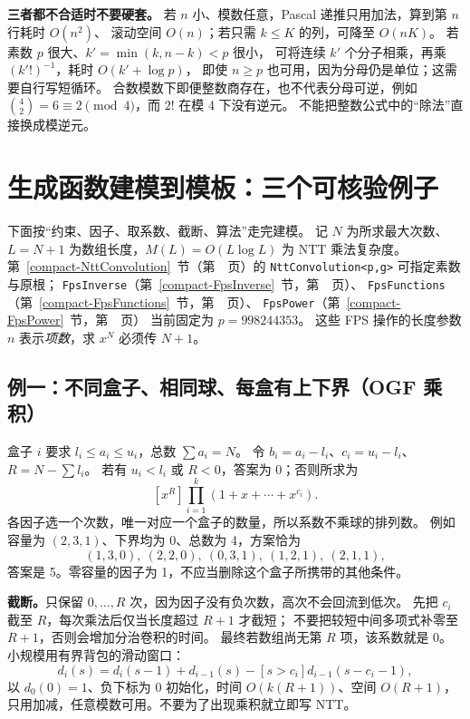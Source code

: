 \textbf{三者都不合适时不要硬套。}
若 $n$ 小、模数任意，Pascal 递推只用加法，算到第 $n$ 行耗时 $O(n^2)$、
滚动空间 $O(n)$；若只需 $k\le K$ 的列，可降至 $O(nK)$。
若素数 $p$ 很大、$k'=\min(k,n-k)<p$ 很小，
可将连续 $k'$ 个分子相乘，再乘 $(k'!)^{-1}$，耗时 $O(k'+\log p)$，
即使 $n\ge p$ 也可用，因为分母仍是单位；这需要自行写短循环。
合数模数下即便整数商存在，也不代表分母可逆，例如
$\binom42=6\equiv2\pmod4$，而 $2!$ 在模 4 下没有逆元。
不能把整数公式中的“除法”直接换成模逆元。

\section{生成函数建模到模板：三个可核验例子}\label{knowledge-generating-examples}
下面按“约束、因子、取系数、截断、算法”走完建模。
记 $N$ 为所求最大次数、$L=N+1$ 为数组长度，$M(L)=O(L\log L)$ 为 NTT 乘法复杂度。
第~\ref{compact-NttConvolution}~节（第~\pageref{compact-NttConvolution}~页）的 \texttt{NttConvolution<p,g>} 可指定素数与原根；
\texttt{FpsInverse}（第~\ref{compact-FpsInverse}~节，第~\pageref{compact-FpsInverse}~页）、
\texttt{FpsFunctions}（第~\ref{compact-FpsFunctions}~节，第~\pageref{compact-FpsFunctions}~页）、
\texttt{FpsPower}（第~\ref{compact-FpsPower}~节，第~\pageref{compact-FpsPower}~页）
当前固定为 $p=998244353$。
这些 FPS 操作的长度参数 $n$ 表示\emph{项数}，求 $x^N$ 必须传 $N+1$。

\subsection{例一：不同盒子、相同球、每盒有上下界（OGF 乘积）}
盒子 $i$ 要求 $l_i\le a_i\le u_i$，总数 $\sum a_i=N$。
令 $b_i=a_i-l_i$、$c_i=u_i-l_i$、$R=N-\sum l_i$。
若有 $u_i<l_i$ 或 $R<0$，答案为 0；否则所求为
\[
[x^R]\prod_{i=1}^k(1+x+\cdots+x^{c_i}).
\]
各因子选一个次数，唯一对应一个盒子的数量，所以系数不乘球的排列数。
例如容量为 $(2,3,1)$、下界均为 0、总数为 4，方案恰为
\[
(1,3,0),\ (2,2,0),\ (0,3,1),\ (1,2,1),\ (2,1,1),
\]
答案是 5。零容量的因子为 1，不应当删除这个盒子所携带的其他条件。

\textbf{截断。}只保留 $0,\ldots,R$ 次，因为因子没有负次数，高次不会回流到低次。
先把 $c_i$ 截至 $R$，每次乘法后仅当长度超过 $R+1$ 才截短；
不要把较短中间多项式补零至 $R+1$，否则会增加分治卷积的时间。
最终若数组尚无第 $R$ 项，该系数就是 0。
小规模用有界背包的滑动窗口：
\[
d_i(s)=d_i(s-1)+d_{i-1}(s)-[s>c_i]d_{i-1}(s-c_i-1),
\]
以 $d_0(0)=1$、负下标为 0 初始化，时间 $O(k(R+1))$、空间 $O(R+1)$，
只用加减，任意模数可用。不要为了出现乘积就立即写 NTT。

